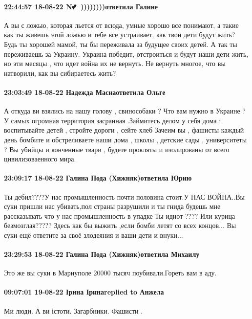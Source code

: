 \paragraph{22:44:57 18-08-22 N💕🌹 ))))))))ответила Галине}

А вы с ложью, которая льется от всюда, умные хорошо все понимают, а такие как
ты живешь этой ложью и тебе все устраивает, как твои дети будут жить? Будь ты
хорошей мамой, ты бы переживала за будущее своих детей. А так ты переживаешь за
Украину. Украина победит, отстроиться и будут наши дети жить, но эти месяцы ,
что идет война их не вернуть. Не вернуть многое, что вы натворили, как вы
сибираетесь жить?

\paragraph{23:03:49 18-08-22 Надежда Маснаответила Ольге}

А откуда ви взялись на нашу голову , свинособаки ? Что вам нужно в Украине ? У
самых огромная территория засранная .Займитесь делом у себя дома : воспитывайте
детей , стройте дороги , сейте хлеб Зачеим вы , фашисты каждый день бомбите и
обстреливаете наши дома , школы , детские сады , университеты ? Вы убийцы и
конченные твари , будете прокляты и изолированы от всего цивилизоваенного мира.

\paragraph{23:09:17 18-08-22 Галина Пода (Хижняк)ответила Юрию}

Ты дебил????У нас промышленность почти половина стоит.У НАС ВОЙНА..Вы суки
пришли нас убивать,пол страны разрушили и ты гнида будешь мне рассказывать что
у нас промышленность в упадке Ты идиот ???? Или курица безмозглая????? Здесь
как бы выжить ,если бомби летят со всех концов... Вы суки ещё ответите за своё
злодеяния и ваши дети и внуки...

\paragraph{23:29:53 18-08-22 Галина Пода (Хижняк)ответила Михаилу}

Это же вы суки в Мариуполе 20000 тысяч поубивали.Гореть вам в аду.

\paragraph{09:07:01 19-08-22 Ірина Іринаreplied to Анжела}

Ми люди. А ви істоти. Загарбники. Фашисти .
